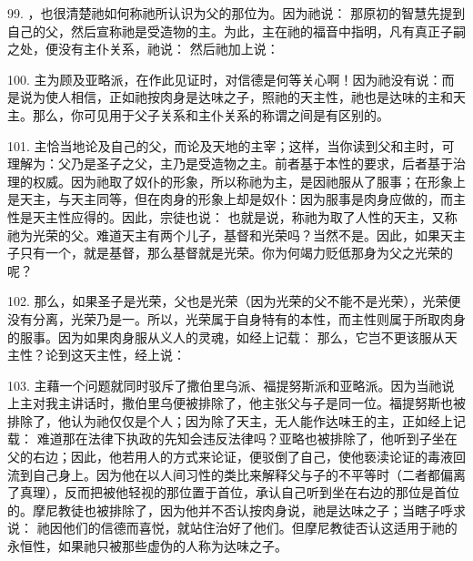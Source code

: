 \par

99. ，也很清楚祂如何称祂所认识为父的那位为。因为祂说：  那原初的智慧先提到自己的父，然后宣称祂是受造物的主。为此，主在祂的福音中指明，凡有真正子嗣之处，便没有主仆关系，祂说： 然后祂加上说： \par

100. 主为顾及亚略派，在作此见证时，对信德是何等关心啊！因为祂没有说：而是说为使人相信，正如祂按肉身是达味之子，照祂的天主性，祂也是达味的主和天主。那么，你可见用于父子关系和主仆关系的称谓之间是有区别的。\par

101. 主恰当地论及自己的父，而论及天地的主宰；这样，当你读到父和主时，可理解为：父乃是圣子之父，主乃是受造物之主。前者基于本性的要求，后者基于治理的权威。因为祂取了奴仆的形象，所以称祂为主，是因祂服从了服事；在形象上是天主，与天主同等，但在肉身的形象上却是奴仆：因为服事是肉身应做的，而主性是天主性应得的。因此，宗徒也说：  也就是说，称祂为取了人性的天主，又称祂为光荣的父。难道天主有两个儿子，基督和光荣吗？当然不是。因此，如果天主子只有一个，就是基督，那么基督就是光荣。你为何竭力贬低那身为父之光荣的呢？\par

102. 那么，如果圣子是光荣，父也是光荣（因为光荣的父不能不是光荣），光荣便没有分离，光荣乃是一。所以，光荣属于自身特有的本性，而主性则属于所取肉身的服事。因为如果肉身服从义人的灵魂，如经上记载：  那么，它岂不更该服从天主性？论到这天主性，经上说：\par

103. 主藉一个问题就同时驳斥了撒伯里乌派、福提努斯派和亚略派。因为当祂说上主对我主讲话时，撒伯里乌便被排除了，他主张父与子是同一位。福提努斯也被排除了，他认为祂仅仅是个人；因为除了天主，无人能作达味王的主，正如经上记载：  难道那在法律下执政的先知会违反法律吗？亚略也被排除了，他听到子坐在父的右边；因此，他若用人的方式来论证，便驳倒了自己，使他亵渎论证的毒液回流到自己身上。因为他在以人间习性的类比来解释父与子的不平等时（二者都偏离了真理），反而把被他轻视的那位置于首位，承认自己听到坐在右边的那位是首位的。摩尼教徒也被排除了，因为他并不否认按肉身说，祂是达味之子；当瞎子呼求说：  祂因他们的信德而喜悦，就站住治好了他们。但摩尼教徒否认这适用于祂的永恒性，如果祂只被那些虚伪的人称为达味之子。\par

